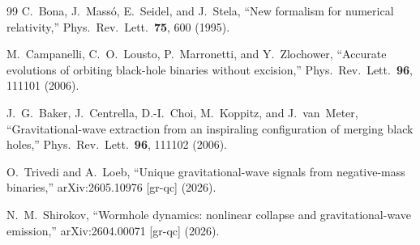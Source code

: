 \documentclass[twocolumn,floatfix,aps,prd,nofootinbib]{revtex4-2}
\begin{document}
\begin{thebibliography}{99}
C.~Bona, J.~Mass\'o, E.~Seidel, and J.~Stela,
\newblock ``New formalism for numerical relativity,''
\newblock Phys.\ Rev.\ Lett.\ \textbf{75}, 600 (1995).

M.~Campanelli, C.~O.~Lousto, P.~Marronetti, and Y.~Zlochower,
\newblock ``Accurate evolutions of orbiting black-hole binaries without excision,''
\newblock Phys.\ Rev.\ Lett.\ \textbf{96}, 111101 (2006).

J.~G.~Baker, J.~Centrella, D.-I.~Choi, M.~Koppitz, and J.~van~Meter,
\newblock ``Gravitational-wave extraction from an inspiraling configuration of merging black holes,''
\newblock Phys.\ Rev.\ Lett.\ \textbf{96}, 111102 (2006).

O.~Trivedi and A.~Loeb,
\newblock ``Unique gravitational-wave signals from negative-mass binaries,''
\newblock arXiv:2605.10976 [gr-qc] (2026).

N.~M.~Shirokov,
\newblock ``Wormhole dynamics: nonlinear collapse and gravitational-wave emission,''
\newblock arXiv:2604.00071 [gr-qc] (2026).

\end{thebibliography}
\end{document}
